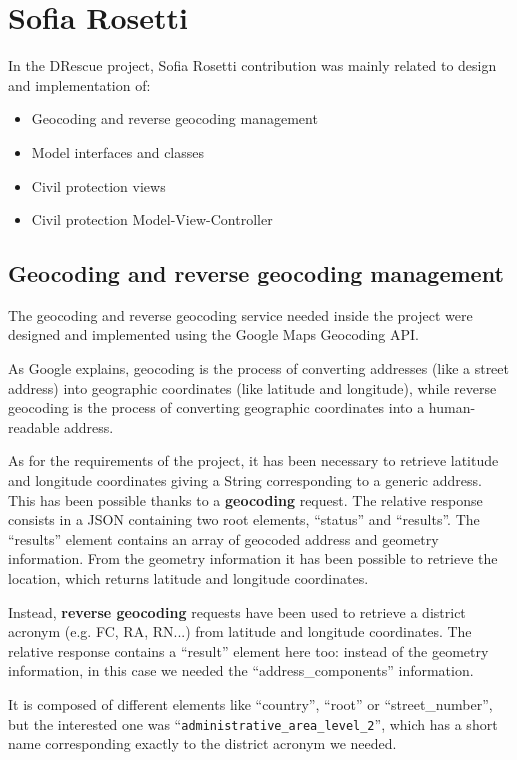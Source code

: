 \documentclass[a4paper,12pt]{report}
\begin{document}
\section{Sofia Rosetti}
In the DRescue project, Sofia Rosetti contribution was mainly related to design and implementation of:

\begin{itemize}
\item Geocoding and reverse geocoding management
\item Model interfaces and classes
\item Civil protection views
\item Civil protection Model-View-Controller
\end{itemize}

\subsection{Geocoding and reverse geocoding management}
The geocoding and reverse geocoding service needed inside the project were designed and implemented using the Google Maps Geocoding API.

As Google explains, geocoding is the process of converting addresses (like a street address) into geographic coordinates (like latitude and longitude), while reverse geocoding is the process of converting geographic coordinates into a human-readable address.

As for the requirements of the project, it has been necessary to retrieve latitude and longitude coordinates giving a String corresponding to a generic address. This has been possible thanks to a \textbf{geocoding} request. The relative response consists in a JSON containing two root elements, ``status'' and ``results''. The ``results'' element contains an array of geocoded address and geometry information. From the geometry information it has been possible to retrieve the location, which returns latitude and longitude coordinates. 

Instead, \textbf{reverse geocoding} requests have been used to retrieve a district acronym (e.g. FC, RA, RN...) from latitude and longitude coordinates. The relative response contains a ``result'' element here too: instead of the geometry information, in this case we needed the ``address\_components'' information. 

It is composed of different elements like ``country'', ``root'' or ``street\_number'', but the interested one was ``\texttt{administrative\_area\_level\_2}'', which has a short name corresponding exactly to the district acronym we needed.
\end{document}

